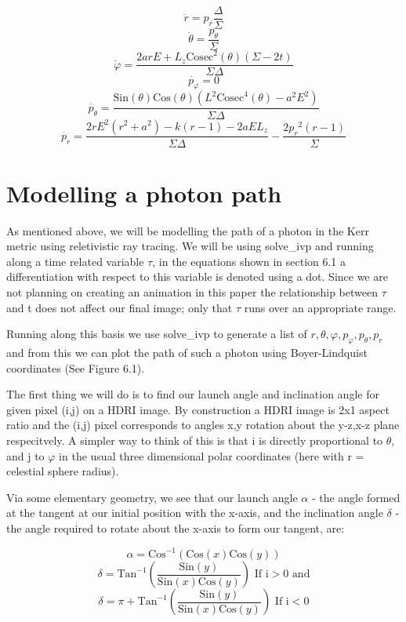 \documentclass[oneside,openright,frontopenright, singlespacing]{dmathesis}
\begin{document}
	\[\dot{r} = p_r\frac{\Delta}{\Sigma}\]
	\[\dot{\theta} = \frac{p_\theta}{\Sigma}\]
	\[\dot{\varphi} = \frac{2arE+L_{z}\mbox{Cosec}^2(\theta)(\Sigma-2t)}{\Sigma\Delta}\]
	\[\dot{p_{\varphi}} = 0\]
	\[\dot{p_{\theta}} = \frac{\mbox{Sin}(\theta)\mbox{Cos}(\theta)(L^2\mbox{Cosec}^4(\theta)-a^2E^2)}{\Sigma\Delta}\]
	\[\dot{p_{r}} = \frac{2rE^2(r^2+a^2)-k(r-1)-2aEL_{z}}{\Sigma\Delta}-\frac{2{p_{r}}^2(r-1)}{\Sigma}\]

\section{Modelling a photon path}

	As mentioned above, we will be modelling the path of a photon in the Kerr metric using reletivistic ray tracing. We will be using solve\_ivp and running along a time related variable $\tau$, in the equations shown in section 6.1 a differentiation with respect to this variable is denoted using a dot. Since we are not planning on creating an animation in this paper the relationship between $\tau$ and t does not affect our final image; only that $\tau$ runs over an appropriate range.

\vspace{1em}
	Running along this basis we use solve\_ivp to generate a list of $r,\theta,\varphi,p_{\varphi},p_{\theta},p_{r}$ and from this we can plot the path of such a photon using Boyer-Lindquist coordinates (See Figure 6.1).

\vspace{1em}
	The first thing we will do is to find our launch angle and inclination angle for given pixel (i,j) on a HDRI image. By construction a HDRI image is 2x1 aspect ratio and the (i,j) pixel corresponds to angles x,y rotation about the y-z,x-z plane respecitvely. A simpler way to think of this is that i is directly proportional to $\theta$, and j to $\varphi$ in the usual three dimensional polar coordinates (here with r = celestial sphere radius).

\vspace{1em}
	Via some elementary geometry, we see that our launch angle $\alpha$ - the angle formed at the tangent at our initial position with the x-axis, and the inclination angle $\delta$ - the angle required to rotate about the x-axis to form our tangent, are:

	\[\alpha = \mbox{Cos}^{-1}(\mbox{Cos}(x)\mbox{Cos}(y))\]
	\[\delta = \mbox{Tan}^{-1}\left(\frac{\mbox{Sin}(y)}{\mbox{Sin}(x)\mbox{Cos}(y)}\right)\mbox{ If i}>0\mbox{ and} \]
	\[\delta = \pi+\mbox{Tan}^{-1}\left(\frac{\mbox{Sin}(y)}{\mbox{Sin}(x)\mbox{Cos}(y)}\right)\mbox{ If i}<0\]
\end{document}

